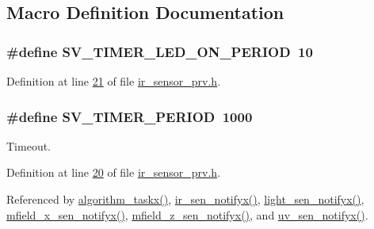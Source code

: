 \subsection{Macro Definition Documentation}
\hypertarget{a00023_a44e4917fdf9d2a3574a3dd34537d97a7}{
\subsubsection[{S\+V\+\_\+\+T\+I\+M\+E\+R\+\_\+\+L\+E\+D\+\_\+\+O\+N\+\_\+\+P\+E\+R\+I\+O\+D}]{\setlength{\rightskip}{0pt plus 5cm}\#define S\+V\+\_\+\+T\+I\+M\+E\+R\+\_\+\+L\+E\+D\+\_\+\+O\+N\+\_\+\+P\+E\+R\+I\+O\+D~10}}\label{a00023_a44e4917fdf9d2a3574a3dd34537d97a7}


Definition at line \hyperlink{a00023_source_l00021}{21} of file \hyperlink{a00023_source}{ir\+\_\+sensor\+\_\+prv.\+h}.

\hypertarget{a00023_a8a535456285f4602701c814d7b69cc68}{
\subsubsection[{S\+V\+\_\+\+T\+I\+M\+E\+R\+\_\+\+P\+E\+R\+I\+O\+D}]{\setlength{\rightskip}{0pt plus 5cm}\#define S\+V\+\_\+\+T\+I\+M\+E\+R\+\_\+\+P\+E\+R\+I\+O\+D~1000}}\label{a00023_a8a535456285f4602701c814d7b69cc68}


Timeout. 



Definition at line \hyperlink{a00023_source_l00020}{20} of file \hyperlink{a00023_source}{ir\+\_\+sensor\+\_\+prv.\+h}.



Referenced by \hyperlink{a00038_source_l01905}{algorithm\+\_\+taskx()}, \hyperlink{a00045_source_l00141}{ir\+\_\+sen\+\_\+notifyx()}, \hyperlink{a00047_source_l00106}{light\+\_\+sen\+\_\+notifyx()}, \hyperlink{a00050_source_l00107}{mfield\+\_\+x\+\_\+sen\+\_\+notifyx()}, \hyperlink{a00053_source_l00114}{mfield\+\_\+z\+\_\+sen\+\_\+notifyx()}, and \hyperlink{a00073_source_l00141}{uv\+\_\+sen\+\_\+notifyx()}.


